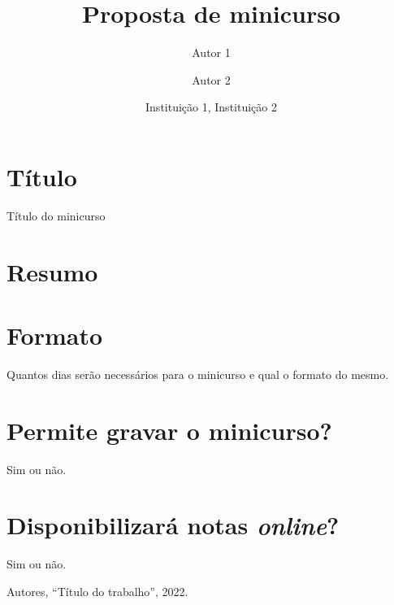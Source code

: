 \documentclass[12pt]{article}
\title{Proposta de minicurso}
\author{Autor 1 \and Autor 2}
\date{Instituição 1, Instituição 2}
\begin{document}
\maketitle

\section{Título}

Título do minicurso

\section{Resumo}

\lipsum[1]

\section{Formato}

Quantos dias serão necessários para o minicurso e qual o formato do
mesmo.

\section{Permite gravar o minicurso?}

Sim ou não.

\section{Disponibilizará notas \emph{online}?}

Sim ou não.

\begin{thebibliography}{XXXXXX}

 Autores, ``Título do trabalho'', 2022.

\end{thebibliography}
\end{document}
